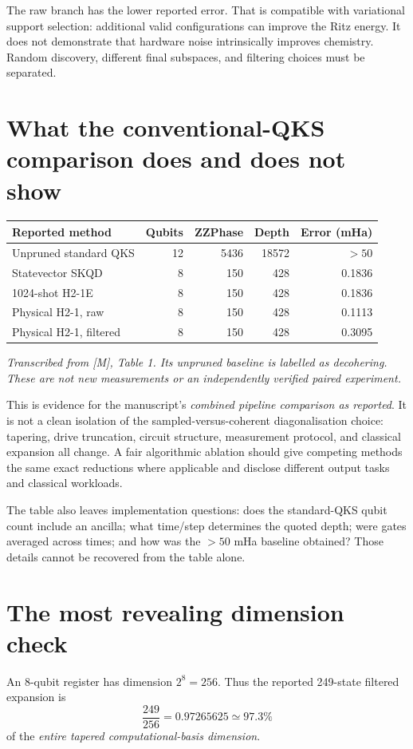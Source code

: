 \documentclass[11pt,a4paper,oneside]{report}
\begin{document}
The raw branch has the lower reported error. That is compatible with variational support selection: additional valid configurations can improve the Ritz energy. It does not demonstrate that hardware noise intrinsically improves chemistry. Random discovery, different final subspaces, and filtering choices must be separated.

\section{What the conventional-QKS comparison does and does not show}
\begin{center}
\small
\begin{tabularx}{\linewidth}{@{}Yrrrr@{}}
\toprule Reported method & Qubits & ZZPhase & Depth & Error (mHa)\\\midrule
Unpruned standard QKS &12&5436&18572&$>50$\\
Statevector SKQD &8&150&428&0.1836\\
1024-shot H2-1E &8&150&428&0.1836\\
Physical H2-1, raw &8&150&428&0.1113\\
Physical H2-1, filtered &8&150&428&0.3095\\\bottomrule
\end{tabularx}
\end{center}
\textit{Transcribed from [M], Table 1. Its unpruned baseline is labelled as decohering. These are not new measurements or an independently verified paired experiment.}

This is evidence for the manuscript's \emph{combined pipeline comparison as reported}. It is not a clean isolation of the sampled-versus-coherent diagonalisation choice: tapering, drive truncation, circuit structure, measurement protocol, and classical expansion all change. A fair algorithmic ablation should give competing methods the same exact reductions where applicable and disclose different output tasks and classical workloads.

The table also leaves implementation questions: does the standard-QKS qubit count include an ancilla; what time/step determines the quoted depth; were gates averaged across times; and how was the $>50$ mHa baseline obtained? Those details cannot be recovered from the table alone.

\section{The most revealing dimension check}
An 8-qubit register has dimension $2^8=256$. Thus the reported 249-state filtered expansion is
\begin{equation}
\frac{249}{256}=0.97265625\simeq97.3\%
\end{equation}
of the \emph{entire tapered computational-basis dimension}.
\end{document}
